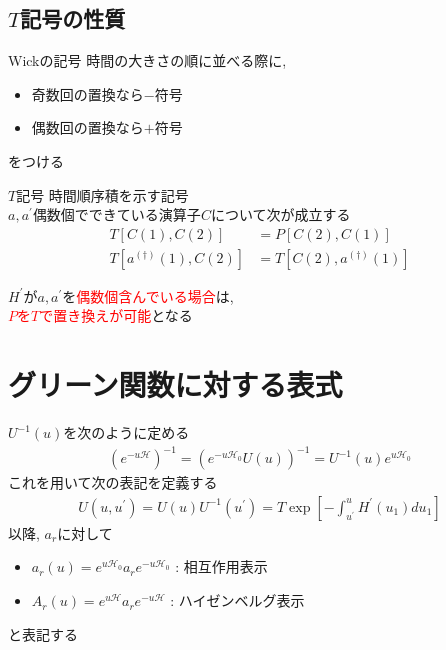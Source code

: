 \documentclass[dvipdfmx,10pt]{beamer}
\begin{document}
\subsection{$T$記号の性質}
\begin{frame}
    \begin{block}{Wickの記号}
        時間の大きさの順に並べる際に, 
        \begin{itemize}
            \centering
            \item 奇数回の置換なら$-$符号
            \item 偶数回の置換なら$+$符号
        \end{itemize}
        をつける
    \end{block}
    \begin{block}{$T$記号}
        時間順序積を示す記号\\
        $a,a^{'}$偶数個でできている演算子$C$について次が成立する
        \begin{align}
            T[C(1),C(2)] &= P[C(2),C(1)] \tag{16} \\
            T[a^{(\dagger)}(1),C(2)] &= T[C(2),a^{(\dagger)}(1)] \tag{17}
        \end{align}
    \end{block}
    \centering
    $H^{'}$が$a,a^{'}$を\textcolor{red}{偶数個含んでいる場合}は,\\ \textcolor{red}{$P$を$T$で置き換えが可能}となる
\end{frame}


\section{グリーン関数に対する表式}
\begin{frame}
    $U^{-1}(u)$を次のように定める
    \begin{align}
        \left(e^{-u\mathscr{H}}\right)^{-1} = \left(e^{-u\mathscr{H}_0}U(u)\right)^{-1} = U^{-1}(u)e^{u\mathscr{H}_0} \tag{18}
    \end{align}
    これを用いて次の表記を定義する
    \begin{align}
        U(u,u^{'})=U(u)U^{-1}(u^{'}) = T\exp\left[-\int_{u^{'}}^uH^{'}(u_1)du_1\right] \tag{24}
    \end{align}
    以降, $a_r$に対して
    \begin{itemize}
        \item $a_r(u) = e^{u\mathscr{H}_0}a_re^{-u\mathscr{H}_0}$ : 相互作用表示
        \item $A_r(u) = e^{u\mathscr{H}}a_re^{-u\mathscr{H}}$ : ハイゼンベルグ表示
    \end{itemize}
    と表記する
\end{frame}
\end{document}
